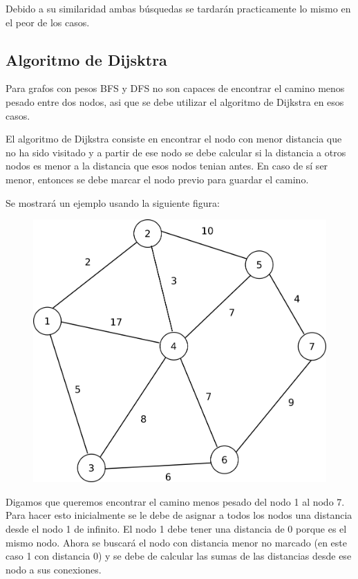\documentclass{article}
\begin{document}
Debido a su similaridad ambas búsquedas se tardarán practicamente lo mismo en el peor de los casos.

\subsection{Algoritmo de Dijsktra}

Para grafos con pesos BFS y DFS no son capaces de encontrar el camino menos pesado entre dos nodos, asi que se debe utilizar el algoritmo de Dijkstra en esos casos.

El algoritmo de Dijkstra consiste en encontrar el nodo con menor distancia que no ha sido visitado y a partir de ese nodo se debe calcular si la distancia a otros nodos es menor a la distancia que esos nodos tenian antes. En caso de sí ser menor, entonces se debe marcar el nodo previo para guardar el camino.

Se mostrará un ejemplo usando la siguiente figura:

\begin{figure}[H]
    \centering
    \includegraphics[width=0.4\paperwidth]{dijkstra}
\end{figure}

Digamos que queremos encontrar el camino menos pesado del nodo 1 al nodo 7. Para hacer esto inicialmente se le debe de asignar a todos los nodos una distancia desde el nodo 1 de infinito. El nodo 1 debe tener una distancia de 0 porque es el mismo nodo. Ahora se buscará el nodo con distancia menor no marcado (en este caso 1 con distancia 0) y se debe de calcular las sumas de las distancias desde ese nodo a sus conexiones.
\end{document}
